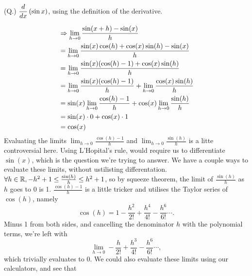 \documentclass{article}
\newcounter{question}
\newcommand{\questionDefinition}[2][\ddx]{
  \stepcounter{question}
  (Q\thequestion.) $\displaystyle #1\lb #2 \rb$, using the definition of the derivative.
}
\begin{document}
\questionDefinition{\sinx}
\begin{align*}
  &\Rightarrow \lim_{h\to0} \frac{\sin(x+h) - \sin(x)}{h} \\
  &= \lim_{h\to0} \frac{\sin(x)\cos(h) + \cos(x)\sin(h) - \sin(x)}{h} \\
  &= \lim_{h\to0} \frac{\sin(x)(\cos(h) - 1) + \cos(x)\sin(h)}{h} \\
  &= \lim_{h\to0} \frac{\sin(x)(\cos(h) - 1)}{h} + \lim_{h\to0} \frac{\cos(x)\sin(h)}{h} \\
  &= \sin(x)\lim_{h\to0} \frac{ \cos(h) - 1}{h} + \cos(x)\lim_{h\to0} \frac{\sin(h)}{h} \\
  &= \sin(x)\cdot0 + \cos(x)\cdot1 \\
  &= \cos(x)
\end{align*}
Evaluating the limits $\lim_{h\to0}\frac{\cos(h)-1}{h}$ and $\lim_{h\to0}\frac{\sin(h)}{h}$ is a litte controversial here. Using L'Hopital's rule, would require us to differentiate $\sin(x)$, which is the question we're trying to answer. We have a couple ways to evaluate these limits, without ustilisting differentation. $\forall h\in\mathbb{R}, -h^2 + 1 \leq \frac{\sin(h)}{h} \leq h^2+1$, so by squeeze theorem, the limit of $\frac{\sin(h)}{h}$ as $h$ goes to $0$ is 1. $\frac{\cos(h) - 1}{h}$ is a little tricker and utilises the Taylor series of $\cos(h)$, namely
$$
  \cos(h) = 1 - \frac{h^2}{2!} + \frac{h^4}{4!} - \frac{h^6}{6!} \cdots .
$$
Minus 1 from both sides, and cancelling the denominator $h$ with the polynomial terms, we're left with
$$
  \lim_{h\to0} -\frac{h}{2!} +\frac{h^3}{4!} -\frac{h^6}{6!} \cdots ,
$$
which trivially evaluates to $0$. We could also evaluate these limits using our calculators, and see that
\end{document}
